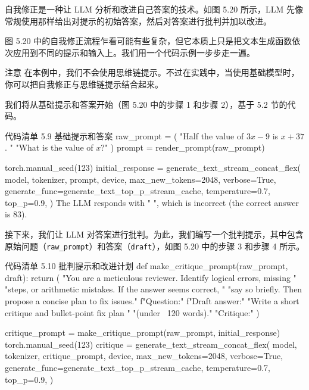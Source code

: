
自我修正是一种让 LLM 分析和改进自己答案的技术。如图 5.20 所示，LLM 先像常规使用那样给出对提示的初始答案，然后对答案进行批判并加以改进。

图 5.20 中的自我修正流程乍看可能有些复杂，但它本质上只是把文本生成函数依次应用到不同的提示和输入上。我们用一个代码示例一步步走一遍。

\begin{myWarning}{注意}
 在本例中，我们不会使用思维链提示。不过在实践中，当使用基础模型时，你可以把自我修正与思维链提示结合起来。\end{myWarning}

我们将从基础提示和答案开始（图 5.20 中的步骤 1 和步骤 2），基于 5.2 节的代码。


\begin{codeboxt}{代码清单 5.9 基础提示和答案}
raw_prompt = (
    "Half the value of $3x-9$ is $x+37$. "
    "What is the value of $x$?"
)
prompt = render_prompt(raw_prompt)

torch.manual_seed(123)
initial_response = generate_text_stream_concat_flex(
    model, tokenizer, prompt, device,
    max_new_tokens=2048, verbose=True,
    generate_func=generate_text_top_p_stream_cache,
    temperature=0.7,
    top_p=0.9,
)
The LLM responds with " ", which is incorrect (the correct answer is 83).
\end{codeboxt}

接下来，我们让 LLM 对答案进行批判。为此，我们编写一个批判提示，其中包含原始问题（\texttt{raw\_prompt}）和答案（\texttt{draft}），如图 5.20 中的步骤 3 和步骤 4 所示。

\begin{codeboxt}{代码清单 5.10 批判提示和改进计划}
def make_critique_prompt(raw_prompt, draft):
    return (
        "You are a meticulous reviewer. Identify logical errors, missing "
        "steps, or arithmetic mistakes. If the answer seems correct, "
        "say so briefly. Then propose a concise plan to fix issues.\n\n"
        f"Question:\n\n"
        f"Draft answer:\n\n"
        "Write a short critique and bullet-point fix plan "
        "(under ~120 words).\n"
        "Critique:"
    )

critique_prompt = make_critique_prompt(raw_prompt, initial_response)
torch.manual_seed(123)
critique = generate_text_stream_concat_flex(
    model, tokenizer, critique_prompt, device,
    max_new_tokens=2048, verbose=True,
    generate_func=generate_text_top_p_stream_cache,
    temperature=0.7,
    top_p=0.9,
)
\end{codeboxt}

